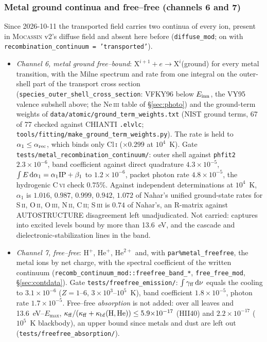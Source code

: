 \documentclass[english,a4paper]{my_memo}
\newcommand{\code}[1]{\texttt{#1}}
\begin{document}
\subsubsection{Metal ground continua and free--free (channels 6 and 7)}
\label{sec:metalcont}
Since 2026-10-11 the transported field carries two continua of every ion,
present in \textsc{Mocassin} v2's diffuse field and absent here before
(\code{diffuse\_mod}; on with \code{recombination\_continuum =
'transported'}).
\begin{itemize}
\item \emph{Channel 6, metal ground free--bound}: $\mathrm{X}^{i+1} + e
  \to \mathrm{X}^{i}$(ground) for every metal transition, with the Milne
  spectrum and rate from one integral on the outer-shell part of the
  transport cross section (\code{species\_outer\_shell\_\allowbreak cross\_section}:
  VFKY96 below $E_{\rm inn}$, the VY95 valence subshell above; the
  Ne\,\textsc{iii} table of \S\ref{sec:photo}) and the ground-term weights
  of \code{data/atomic/ground\_term\_weights.txt} (NIST ground terms, 67 of
  77 checked against CHIANTI \code{.elvlc};
  \code{tools/fitting/make\_ground\_term\_weights.py}).  The rate is held to
  $\alpha_1 \le \alpha_{\rm rec}$, which binds only Cl\,\textsc{i} ($\times
  0.299$ at $10^4$~K).  Gate \code{tests/metal\_recombination\_continuum/}:
  outer shell against \code{phfit2} $2.3{\times}10^{-6}$, band coefficient
  against direct quadrature $4.3{\times}10^{-5}$, $\int E\,{\rm d}\alpha_1 =
  \alpha_1{\rm IP} + \beta_1$ to $1.2{\times}10^{-6}$, packet photon rate
  $4.8{\times}10^{-5}$, the hydrogenic C\,\textsc{vi} check $0.75\%$.
  Against independent determinations at $10^4$~K, $\alpha_1$ is $1.016$,
  $0.987$, $0.999$, $0.942$, $1.072$ of Nahar's unified ground-state rates
  for S\,\textsc{ii}, O\,\textsc{ii}, O\,\textsc{iii}, N\,\textsc{ii},
  C\,\textsc{ii}; S\,\textsc{iii} is $0.74$ of Nahar's, an R-matrix against
  AUTOSTRUCTURE disagreement left unadjudicated.  Not carried: captures into
  excited levels bound by more than 13.6~eV, and the cascade and
  dielectronic-stabilization lines in the band.
\item \emph{Channel 7, free--free}: H$^+$, He$^+$, He$^{2+}$ and, with
  \code{par\%metal\_freefree}, the metal ions by net charge, with the
  spectral coefficient of the written continuum
  (\code{recomb\_continuum\_mod::freefree\_band\_*}, \code{free\_free\_mod},
  \S\ref{sec:contdata}).  Gate \code{tests/freefree\_emission/}: $\int
  \gamma_{\rm ff}\,{\rm d}\nu$ equals the cooling to $3.1{\times}10^{-6}$
  ($Z = 1$--6, $3{\times}10^3$--$10^5$~K), band coefficient
  $1.8{\times}10^{-5}$, photon rate $1.7{\times}10^{-5}$.  Free--free
  \emph{absorption} is not added: over all leaves and 13.6~eV--$E_{\max}$,
  $\kappa_{\rm ff}/(\kappa_{\rm ff} + \kappa_{\rm bf}({\rm H, He})) \le
  5.9{\times}10^{-17}$ (HII40) and $2.2{\times}10^{-17}$ ($10^5$~K
  blackbody), an upper bound since metals and dust are left out
  (\code{tests/freefree\_absorption/}).
\end{itemize}
\end{document}
